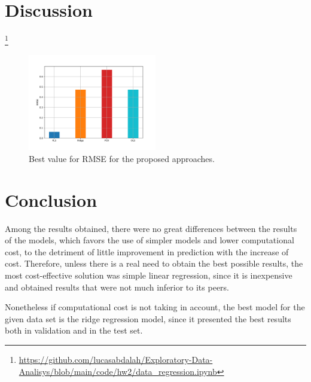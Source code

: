 \section{Discussion}
\footnote{\url{https://github.com/lucasabdalah/Exploratory-Data-Analisys/blob/main/code/hw2/data_regression.ipynb}}

\begin{figure}[htbp!]
  \centerline{\includegraphics[width=0.5\textwidth]{../../code/hw2/figures/5-summary.pdf}}
  \caption{Best value for RMSE for the proposed approaches.}
  \label{fig:5-summary}
\end{figure}


\section{Conclusion}
Among the results obtained, there were no great differences between the results of the models, which favors the use of simpler models and lower computational cost, to the detriment of little improvement in prediction with the increase of cost. Therefore, unless there is a real need to obtain the best possible results, the most cost-effective solution was simple linear regression, since it is inexpensive and obtained results that were not much inferior to its peers. 

Nonetheless if computational cost is not taking in account, the best model for the given data set is the ridge regression model, since it presented the best results both in validation and in the test set.



